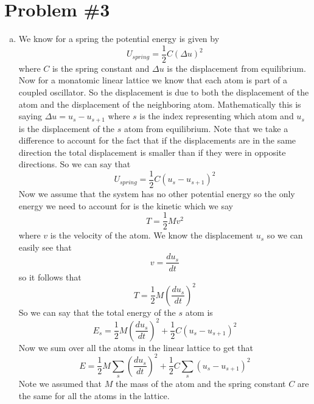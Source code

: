 \documentclass[11pt]{article}
\numberwithin{equation}{section}
\begin{document}
\section{Problem \#3}
\begin{enumerate}[(a)]
\item
We know for a spring the potential energy is given by 
$$U_{spring} = \frac{1}{2}C(\Delta u)^2$$
where $C$ is the spring constant and $\Delta u$ is the displacement from equilibrium. Now for a monatomic linear lattice we know that each atom is part of a coupled oscillator. So the displacement is due to both the displacement of the atom and the displacement of the neighboring atom. Mathematically this is saying $\Delta u = u_s - u_{s+1}$ where $s$ is the index representing which atom and $u_s$ is the displacement of the $s$ atom from equilibrium. Note that we take a difference to account for the fact that if the displacements are in the same direction the total displacement is smaller than if they were in opposite directions. So we can say that
$$U_{spring} = \frac{1}{2}C(u_s-u_{s+1})^2$$
Now we assume that the system has no other potential energy so the only energy we need to account for is the kinetic which we say
$$T = \frac{1}{2}Mv^2$$
where $v$ is the velocity of the atom. We know the displacement $u_s$ so we can easily see that 
$$v = \frac{du_s}{dt}$$
so it follows that
$$T = \frac{1}{2}M\left(\frac{du_s}{dt}\right)^2$$
So we can say that the total energy of the $s$ atom is
$$E_s = \frac{1}{2}M\left(\frac{du_s}{dt}\right)^2 + \frac{1}{2}C(u_s-u_{s+1})^2$$
Now we sum over all the atoms in the linear lattice to get that
$$E = \frac{1}{2}M\sum_{s}\left(\frac{du_s}{dt}\right)^2 + \frac{1}{2}C\sum_{s}(u_s-u_{s+1})^2$$
Note we assumed that $M$ the mass of the atom and the spring constant $C$ are the same for all the atoms in the lattice.


\end{enumerate}
\end{document}
